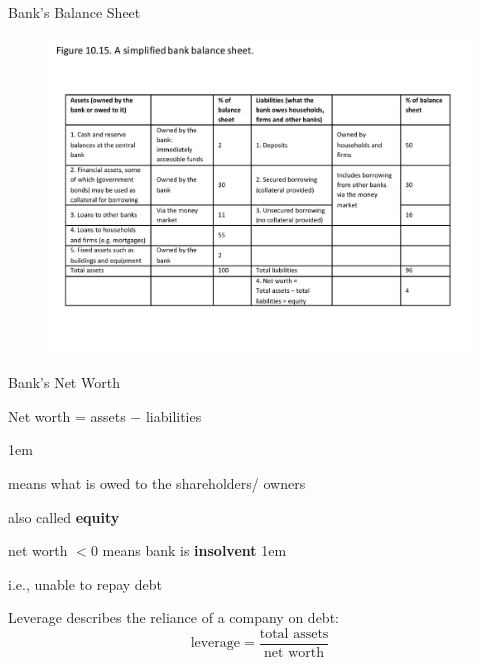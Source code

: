 \documentclass[11pt,aspectratio=43,usenames,dvipsnames]{beamer}
\let\olditemize=\itemize
\let\endolditemize=\enditemize
\renewenvironment{itemize}{\olditemize \itemsep1em}{\endolditemize}
\theoremstyle{definition}
\begin{document}
\begin{frame}{Bank's Balance Sheet}
\label{slide:Bank_s_Balance_Sheet}
    \begin{figure}
        \centering
        \includegraphics[trim = {0cm 0cm 0cm 1.5cm}, clip, width=\textwidth]{./figures/Figure22.pdf}
    \end{figure}

\end{frame}

\begin{frame}{Bank's Net Worth}
\label{slide:Bank_s_Net_Worth}
    \begin{center}
        Net worth = assets $ - $ liabilities
    \end{center}
    \begin{itemize}
        \item means what is owed to the shareholders/ owners
        \item also called \textbf{equity}
        \item net worth $ < 0$ means bank is \textbf{insolvent}
        \begin{itemize}
            \item i.e., unable to repay debt
        \end{itemize}
        \item Leverage describes the reliance of a company on debt:
        \begin{equation*}
            \text{leverage} = \frac{\text{total assets}}{\text{net worth}}
        \end{equation*}

    \end{itemize}

\end{frame}
\end{document}
